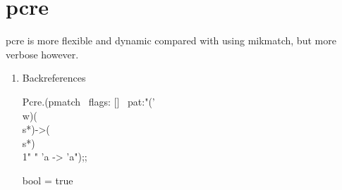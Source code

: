 \section{pcre}
\label{sec:pcre}


pcre is more flexible and dynamic compared with using mikmatch, but
more verbose however.
\begin{enumerate}
\item Backreferences

  \begin{ocamlcode}
 Pcre.(pmatch ~flags: [] ~pat:"('\\w)(\\s*)->(\\s*)\\1" " 'a -> 'a");;    
\end{ocamlcode}
\begin{ocamlcode}
bool = true  
\end{ocamlcode}

\end{enumerate}

